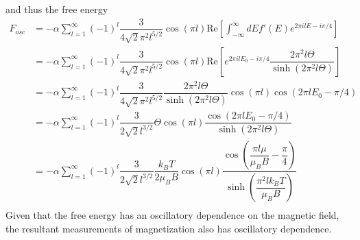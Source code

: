 \documentclass[aps,prb,onecolumn,notitlepage,showpacs,floatfix,superscriptaddress]{revtex4-1}
\begin{document}
and thus the free energy
\begin{equation}
\begin{split}
F_{osc} &= - \alpha  \sum_{l=1}^\infty  (-1)^l \dfrac{3}{4\sqrt{2} \pi^2 l^{5/2}}   \cos(\pi l) \text{Re}\left[  \int_{-\infty}^\infty dE  f'(E ) e^{2\pi i l E -i\pi/4} \right] \\
 &= - \alpha  \sum_{l=1}^\infty  (-1)^l \dfrac{3}{4\sqrt{2} \pi^2 l^{5/2}}   \cos(\pi l) \text{Re}\left[ e^{2\pi i l  E_0 -i\pi /4} \dfrac{2\pi^2  l \Theta}{\sinh(2\pi^2 l \Theta)}   \right] \\
  &= - \alpha  \sum_{l=1}^\infty  (-1)^l \dfrac{3}{4\sqrt{2} \pi^2 l^{5/2}}   \dfrac{2\pi^2  l \Theta}{\sinh(2\pi^2 l \Theta)}   \cos(\pi l) \cos(2\pi l  E_0 -\pi /4) \\
 &= - \alpha  \sum_{l=1}^\infty  (-1)^l \dfrac{3}{2\sqrt{2}  l^{3/2}} \Theta \cos(\pi l)  \dfrac{\cos(2\pi l  E_0 -\pi /4)}{\sinh(2\pi^2 l \Theta)}     \\
  &= - \alpha  \sum_{l=1}^\infty  (-1)^l \dfrac{3}{2\sqrt{2}  l^{3/2}} \dfrac{k_B T}{2\mu_B B} \cos(\pi l)  \dfrac{\cos\left(  \dfrac{\pi l\mu}{\mu_B B} -\dfrac{\pi} {4}\right)}{\sinh\left( \dfrac{\pi^2 l k_B T}{\mu_B B} \right)}     \\
\end{split}
\end{equation}
Given that the free energy has an oscillatory dependence on the magnetic field, the resultant measurements of magnetization also has oscillatory dependence.
\end{document}
